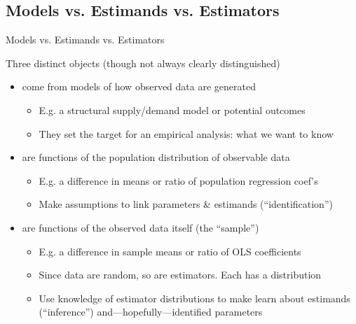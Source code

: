 \documentclass{beamer}
\begin{document}
\subsection{Models vs. Estimands vs. Estimators}
\begin{frame}{Models vs. Estimands vs. Estimators}

Three distinct objects (though not always clearly distinguished) \pause\medskip
{\small
\begin{itemize}
  \item {} come from models of how observed data are generated
  \begin{itemize}\itemsep0em
    \item E.g. a structural supply/demand model or potential outcomes
    \item They set the target for an empirical analysis: what we want to know
  \end{itemize}\pause
  
  \item {} are functions of the population distribution of observable data
  \begin{itemize}\itemsep0em
    \item E.g. a difference in means or ratio of population regression coef's
    \item Make assumptions to link parameters \& estimands (``identification'')
  \end{itemize}\pause
  
  \item {} are functions of the observed data itself (the ``sample'')
  \begin{itemize}\itemsep0em
    \item E.g. a difference in sample means or ratio of OLS coefficients 
    \item Since data are random, so are estimators. Each has a distribution
    \item Use knowledge of estimator distributions to make learn about estimands (``inference'') and---hopefully---identified parameters
  \end{itemize}
\end{itemize}
}
\end{frame}
\end{document}
